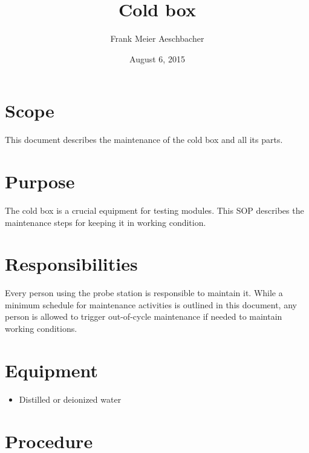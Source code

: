 \documentclass[12pt]{unlsilabsop}
\title{Cold box}
\date{August 6, 2015}
\author{Frank Meier Aeschbacher}
\begin{document}
\maketitle

\section{Scope}
This document describes the maintenance of the cold box and all its parts.

\section{Purpose}
The cold box is a crucial equipment for testing modules. This SOP describes the maintenance steps for keeping it in working condition.


\section{Responsibilities}
Every person using the probe station is responsible to maintain it. While a minimum schedule for maintenance activities is outlined in this document, any person is allowed to trigger out-of-cycle maintenance if needed to maintain working conditions.

\section{Equipment}

\begin{itemize}
    \item Distilled or deionized water
\end{itemize}


\section{Procedure}
\end{document}
